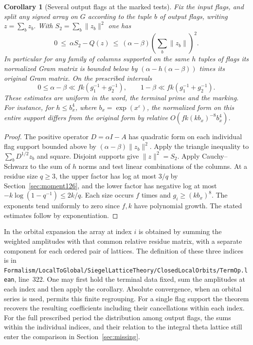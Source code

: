 \documentclass[a4paper,11pt]{article}
\newtheorem{corollary}[proposition]{Corollary}
\theoremstyle{definition}
\theoremstyle{remark}
\newcommand{\srcloc}[2]{{\small\nolinkurl{#1.lean}}, line~#2}
\numberwithin{equation}{section}
\begin{document}
\begin{corollary}[Several output flags at the marked tests]
\leavevmode\label{cor:severalflags526}
Fix the input flags, and split any signed array on \(G\) according
to the tuple \(b\) of output flags, writing \(z=\sum_b z_b\).
With \(S_2=\sum_b\|z_b\|^2\) one has
\[
  0\ \le\ \alpha S_2-Q(z)
             \ \le\ (\alpha-\beta)\left(\sum_b\|z_b\|\right)^2 .
\]
In particular for any family of columns supported on the same
\(h\) tuples of flags its normalized Gram matrix is bounded below by
\((\alpha-h(\alpha-\beta))\) times its original Gram matrix.
On the prescribed intervals
\[
 0\le \alpha-\beta \ll f k(g_1^{-1}+g_2^{-1}),\qquad
  1-\beta\ll f k(g_1^{-1}+g_2^{-1}).
\]
These estimates are uniform in the word, the terminal prime and
the marking. For instance, for \(h\le b_x^4\), where
\(b_x=\exp(x^\varepsilon)\), the normalized form on this entire
support differs from the original form by relative
\(O(f k (k b_x)^{-8} b_x^4)\).
\end{corollary}
\begin{proof}
The positive operator \(D=\alpha I-A\) has quadratic form on each
individual flag support bounded above by \((\alpha-\beta)\|z_b\|^2\).
Apply the triangle inequality to \(\sum_b D^{1/2}z_b\) and square.
Disjoint supports give \(\|z\|^2=S_2\). Apply Cauchy--Schwarz to
the sum of \(h\) norms and test linear combinations of the columns.
At a residue size \(q\ge3\), the upper factor has log at most
\(3/q\) by Section~\ref{sec:moment126}, and the lower factor has
negative log at most \(-k\log(1-q^{-1})\le 2k/q\).
Each size occurs \(f\) times and \(g_i\ge(k b_x)^8\).
The exponents tend uniformly to zero since \(f,k\) have polynomial
growth. The stated estimates follow by exponentiation.
\end{proof}

In the orbital expansion the array at index \(i\) is obtained by
summing the weighted amplitudes with that common relative residue
matrix, with a separate component for each ordered pair of lattices.
The definition of these three indices is in
\srcloc{Formalism/LocalToGlobal/SiegelLatticeTheory/ClosedLocalOrbits/TermOp}{322}.
One may first hold the terminal data fixed, sum the amplitudes at
each index and then apply the corollary. Absolute convergence, when
an orbital series is used, permits this finite regrouping.
For a single flag support the theorem recovers the resulting
coefficients including their cancellations within each index. For
the full prescribed period the distribution among output flags,
the sums within the individual indices, and their relation to
the integral theta lattice still enter the comparison in
Section~\ref{sec:missing}.
\end{document}
